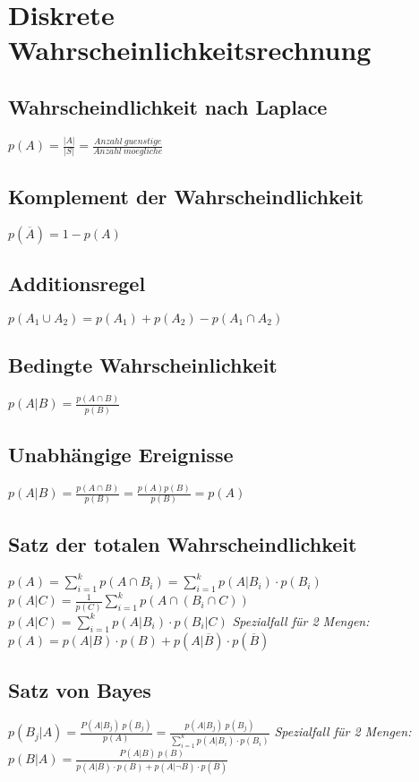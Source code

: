 \section{Diskrete Wahrscheinlichkeitsrechnung}

\subsection{Wahrscheindlichkeit nach Laplace}
$ p(A) = \frac{|A|}{|S|} = \frac{Anzahl\ guenstige}{Anzahl\ moegliche}$

\subsection{Komplement der Wahrscheindlichkeit}
$ p(\overline{A}) = 1 - p(A) $

\subsection{Additionsregel}
$ p(A_1 \cup A_2 ) = p(A_1) + p(A_2) - p(A_1 \cap A_2) $

\subsection{Bedingte Wahrscheinlichkeit}
$ p(A|B) = \frac{p(A \cap B)}{p(B)} $

\subsection{Unabhängige Ereignisse}
$ p(A|B) = \frac{p(A \cap B)}{p(B)} = \frac{p(A) p(B)}{p(B)} = p(A) $

\subsection{Satz der totalen Wahrscheindlichkeit}
$ p(A) = \sum_{i=1}^{k} p(A \cap B_i) = \sum_{i=1}^{k} p(A|B_i) \cdot p(B_i) $
\newline
$ p(A|C) = \frac{1}{p(C)} \sum_{i=1}^{k} p(A \cap (B_i \cap C)) $
\newline
$ p(A|C)= \sum_{i=1}^{k} p(A|B_i) \cdot p(B_i|C) $
\newline \newline
\textit{Spezialfall für 2 Mengen:}\newline
$ p(A) = p(A|B) \cdot p(B) + p(A|\overline{B}) \cdot p(\overline{B}) $

\subsection{Satz von Bayes}
$ p(B_j|A) = \frac{P(A|B_j)\ p(B_j)}{p(A)} = \frac{p(A|B_j)\ p(B_j)}{\sum_{i=1}^{k} p(A|B_i) \cdot p(B_i)} $
\newline \newline
\textit{Spezialfall für 2 Mengen:}\newline
$ p(B|A) = \frac{P(A|B)\ p(B)}{p(A|B) \cdot p(B) + p(A|\neg{B}) \cdot p(\overline{B})} $
